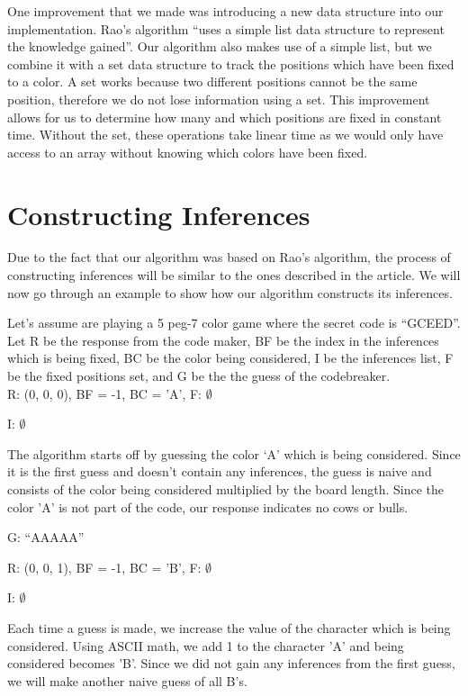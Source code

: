 \documentclass[11pt]{article}
\begin{document}
    One improvement that we made was introducing a new data structure into our implementation. Rao's algorithm \enquote{uses a simple list data structure to represent the knowledge gained}\autocite{rao}. Our algorithm also makes use of a simple list, but we combine it with a set data structure to track the positions which have been fixed to a color. A set works because two different positions cannot be the same position, therefore we do not lose information using a set. This improvement allows for us to determine how many and which positions are fixed in constant time. Without the set, these operations take linear time as we would only have access to an array without knowing which colors have been fixed. 
    
    \section{Constructing Inferences}
    Due to the fact that our algorithm was based on Rao's algorithm, the process of constructing inferences will be similar to the ones described in the article\autocite{rao}. We will now go through an example to show how our algorithm constructs its inferences.

    Let's assume are playing a 5 peg-7 color game where the secret code is \enquote{GCEED}. Let R be the response from the code maker, BF be the index in the inferences which is being fixed, BC be the color being considered, I be the inferences list, F be the fixed positions set, and G be the the guess of the codebreaker.\\

    \noindent R: (0, 0, 0), BF = -1, BC = 'A', F: $\emptyset$

    \noindent I: $\emptyset$

    The algorithm starts off by guessing the color ‘A’ which is being considered. Since it is the first guess and doesn’t contain any inferences, the guess is naive and consists of the color being considered multiplied by the board length. Since the color 'A' is not part of the code, our response indicates no cows or bulls.

    \noindent G: \enquote{AAAAA}

    \noindent R: (0, 0, 1), BF = -1, BC = 'B', F: $\emptyset$

    \noindent I: $\emptyset$

    Each time a guess is made, we increase the value of the character which is being considered. Using ASCII math, we add 1 to the character 'A' and being considered becomes 'B'. Since we did not gain any inferences from the first guess, we will make another naive guess of all B's.
\end{document}
